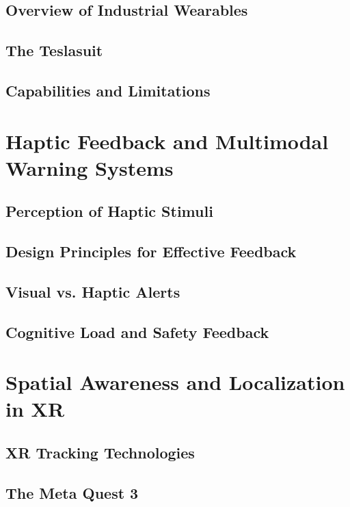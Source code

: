 \subsection{Overview of Industrial Wearables}

\subsection{The Teslasuit}

\subsection{Capabilities and Limitations}

\section{Haptic Feedback and Multimodal Warning Systems}
\subsection{Perception of Haptic Stimuli}

\subsection{Design Principles for Effective Feedback}

\subsection{Visual vs. Haptic Alerts}

\subsection{Cognitive Load and Safety Feedback}

\section{Spatial Awareness and Localization in XR}
\subsection{XR Tracking Technologies}

\subsection{The Meta Quest 3}

